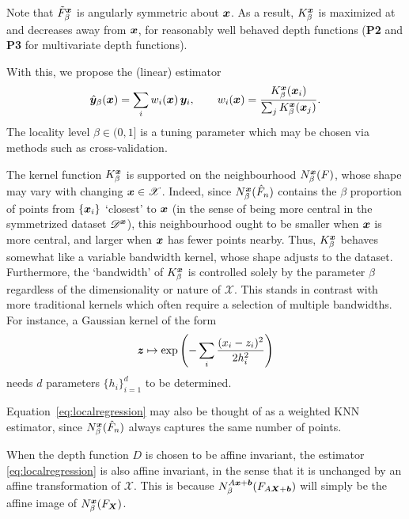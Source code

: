 Note that $\tilde{F}^{\bm{x}}_\beta$ is angularly symmetric about $\bm{x}$.
As a result, $K^{\bm{x}}_\beta$ is maximized at and decreases away from $\bm{x}$,
for reasonably well behaved depth functions (\textbf{P2} and \textbf{P3} for
multivariate depth functions).


With this, we propose the (linear) estimator
\begin{equation}
    \hat{\bm{y}}_\beta(\bm{x}) = \sum_i w_i(\bm{x})\, \bm{y}_i, \qquad
    w_i(\bm{x}) = \frac{K^{\bm{x}}_\beta(\bm{x}_i)}{\sum_j K^{\bm{x}}_\beta(\bm{x}_j)}.
    \label{eq:localregression}
\end{equation}
The locality level $\beta \in (0, 1]$ is a tuning parameter which may be
chosen via methods such as cross-validation.

The kernel function $K^{\bm{x}}_\beta$ is supported on the neighbourhood
$N^{\bm{x}}_\beta(F)$, whose shape may vary with changing $\bm{x} \in \mathscr{X}$.
Indeed, since $N^{\bm{x}}_\beta(\hat{F}_n)$ contains the $\beta$ proportion of
points from $\{\bm{x}_i\}$ `closest' to $\bm{x}$ (in the sense of being more central
in the symmetrized dataset $\mathscr{D}^{\bm{x}}$), this neighbourhood ought to
be smaller when $\bm{x}$ is more central, and larger when $\bm{x}$ has fewer points
nearby.
Thus, $K^{\bm{x}}_\beta$ behaves somewhat like a variable bandwidth kernel, whose
shape adjusts to the dataset.
Furthermore, the `bandwidth' of $K^{\bm{x}}_\beta$ is controlled solely by the
parameter $\beta$ regardless of the dimensionality or nature of $\mathscr{X}$.
This stands in contrast with more traditional kernels which often require a
selection of multiple bandwidths.
For instance, a Gaussian kernel of the form
\begin{equation}
    \bm{z} \mapsto \exp\left(-\sum_i \frac{(x_i - z_i)^2}{2h_i^2}\right)
    \label{eq:kernel_gaussian}
\end{equation}
needs $d$ parameters $\{h_i\}_{i = 1}^d$ to be determined.

Equation~\ref{eq:localregression} may also be thought of as a weighted KNN
estimator, since $N^{\bm{x}}_\beta(\hat{F}_n)$ always captures the same number of
points.

When the depth function $D$ is chosen to be affine invariant, the estimator
\ref{eq:localregression} is also affine invariant, in the sense that it is
unchanged by an affine transformation of $\mathscr{X}$.
This is because $N^{A\bm{x} + \bm{b}}_\beta(F_{A\bm{X} + \bm{b}})$ will simply be
the affine image of $N^{\bm{x}}_\beta(F_{\bm{X}})$.
